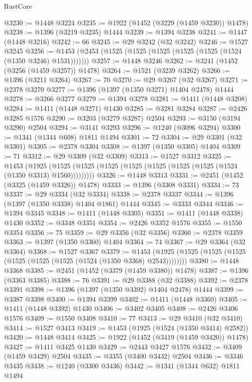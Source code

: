 \begin{lexlean}{RustCore}
\begin{coremodule}
@3230 := @1448 @3224
@3235 := @1922 (@1452 (@3229 (@1459 @3230)) @1478)
@3238 := @1396 (@3219 @3235) @1444
@3239 := @1394 @3238
@3241 := @1447 (@1448 @3216)
@3242 := 66
@3245 := @29 @3242 (@32 @3242)
@3246 := @1527 @3245
@3256 := @1453 (@2453 (@1525 (@1525 (@1525 (@1525 (@1525 (@1524 (@1350 @3246) @1531)))))))
@3257 := @1448 @3246
@3262 := @3241 (@1452 (@3256 (@1459 @3257)) @1478)
@3264 := @1521 (@3239 @3262)
@3266 := @1396 (@3211 @3264)
@3267 := 70
@3270 := @29 @3267 (@32 @3267)
@3271 := @2378 @3270
@3277 := @1396 (@1397 (@1350 @3271) @1404 @2478) @1444
@3278 := @3266 @3277
@3279 := @1394 @3278
@3281 := @1411 (@1448 @3208)
@3284 := @1411 (@1448 @3271) @1430
@3285 := @3281 @3284
@3287 := @2426 @3285 @1576
@3290 := @3203 (@3279 @3287) @2504
@3293 := @3150 (@3194 @3290) @2504
@3294 := @3141 @3293
@3296 := @1240 (@3096 @3294)
@3300 := @1341 (@1344 @608) @1811 @1494
@3301 := 72
@3304 := @29 @3301 (@32 @3301)
@3305 := @2378 @3304
@3308 := @1397 (@1350 @3305) @1404
@3309 := 71
@3312 := @29 @3309 (@32 @3309)
@3313 := @1527 @3312
@3325 := @1453
    (@1925 (@1525 (@1525 (@1525 (@1525 (@1525 (@1525 (@1525 (@1524 (@1350 @3313) @1560)))))))))
@3326 := @1448 @3313
@3331 := @2451 (@1452 (@3325 (@1459 @3326)) @1478)
@3333 := @1396 (@3308 @3331)
@3334 := 73
@3337 := @29 @3334 (@32 @3334)
@3338 := @2378 @3337
@3344 := @1396 (@1397 (@1350 @3338) @1404 @1861) @1444
@3345 := @3333 @3344
@3346 := @1394 @3345
@3348 := @1411 (@1448 @3305)
@3351 := @1411 (@1448 @3338) @1430
@3352 := @3348 @3351
@3354 := @2426 @3352 @1576
@3355 := @1550 @3354
@3356 := 75
@3359 := @29 @3356 (@32 @3356)
@3360 := @2378 @3359
@3363 := @1397 (@1350 @3360) @1404
@3364 := 74
@3367 := @29 @3364 (@32 @3364)
@3368 := @1527 @3367
@3379 := @1453 (@1925 (@1525 (@1525 (@1525 (@1525 (@1525 (@1525 (@1524 (@1350 @3368) @2543))))))))
@3380 := @1448 @3368
@3385 := @2451 (@1452 (@3379 (@1459 @3380)) @1478)
@3387 := @1396 (@3363 @3385)
@3388 := 76
@3391 := @29 @3388 (@32 @3388)
@3392 := @2378 @3391
@3398 := @1396 (@1397 (@1350 @3392) @1404 @2478) @1444
@3399 := @3387 @3398
@3400 := @1394 @3399
@3402 := @1411 (@1448 @3360)
@3405 := @1411 (@1448 @3392) @1430
@3406 := @3402 @3405
@3408 := @2426 @3406 @1576
@3409 := @1550 @3408
@3410 := 77
@3413 := @29 @3410 (@32 @3410)
@3414 := @1527 @3413
@3419 := @1453 (@1925 (@1524 (@1350 @3414) @2582))
@3420 := @1448 @3414
@3425 := @1922 (@1452 (@3419 (@1459 @3420)) @1478)
@3427 := @1411 @3425 @1430
@3429 := @2443 @3427 @1576
@3432 := @3409 (@1459 @3429) @2504
@3435 := @3355 (@3400 @3432) @2504
@3436 := @3346 @3435
@3438 := @1240 (@3300 @3436)
@3442 := @1341 (@1344 @632) @1811 @1494

\end{coremodule}
\end{lexlean}
